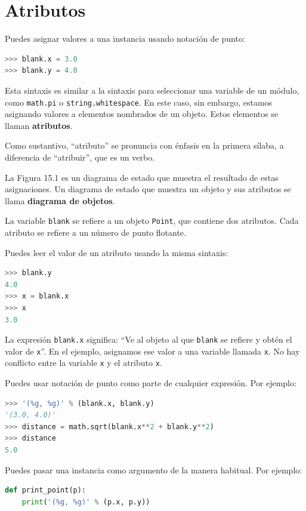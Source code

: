 \section{Atributos}

Puedes asignar valores a una instancia usando notación de punto:

\begin{lstlisting}[language=Python]
>>> blank.x = 3.0
>>> blank.y = 4.0
\end{lstlisting}

Esta sintaxis es similar a la sintaxis para seleccionar una variable de un módulo, como \texttt{math.pi} o \texttt{string.whitespace}. En este caso, sin embargo, estamos asignando valores a elementos nombrados de un objeto. Estos elementos se llaman \textbf{atributos}.

Como sustantivo, ``atributo'' se pronuncia con énfasis en la primera sílaba, a diferencia de ``atribuir'', que es un verbo.

La Figura 15.1 es un diagrama de estado que muestra el resultado de estas asignaciones. Un diagrama de estado que muestra un objeto y sus atributos se llama \textbf{diagrama de objetos}.

La variable \texttt{blank} se refiere a un objeto \texttt{Point}, que contiene dos atributos. Cada atributo se refiere a un número de punto flotante.

Puedes leer el valor de un atributo usando la misma sintaxis:

\begin{lstlisting}[language=Python]
>>> blank.y
4.0
>>> x = blank.x
>>> x
3.0
\end{lstlisting}

La expresión \texttt{blank.x} significa: ``Ve al objeto al que \texttt{blank} se refiere y obtén el valor de \texttt{x}''. En el ejemplo, asignamos ese valor a una variable llamada \texttt{x}. No hay conflicto entre la variable \texttt{x} y el atributo \texttt{x}.

Puedes usar notación de punto como parte de cualquier expresión. Por ejemplo:

\begin{lstlisting}[language=Python]
>>> '(%g, %g)' % (blank.x, blank.y)
'(3.0, 4.0)'
>>> distance = math.sqrt(blank.x**2 + blank.y**2)
>>> distance
5.0
\end{lstlisting}

Puedes pasar una instancia como argumento de la manera habitual. Por ejemplo:

\begin{lstlisting}[language=Python]
def print_point(p):
    print('(%g, %g)' % (p.x, p.y))
\end{lstlisting}

